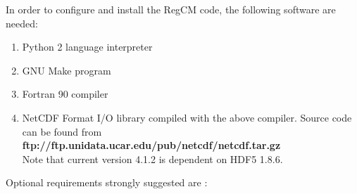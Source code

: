 %
%

In order to configure and install the RegCM code, the following software are
needed:

\begin{enumerate}
\item Python 2 language interpreter
\item GNU Make program
\item Fortran 90 compiler
\item NetCDF Format I/O library compiled with the above compiler.
   Source code can be found from \\
{\bf ftp://ftp.unidata.ucar.edu/pub/netcdf/netcdf.tar.gz} \\
Note that current version 4.1.2 is dependent on HDF5 1.8.6.
\end{enumerate}

Optional requirements strongly suggested are :


